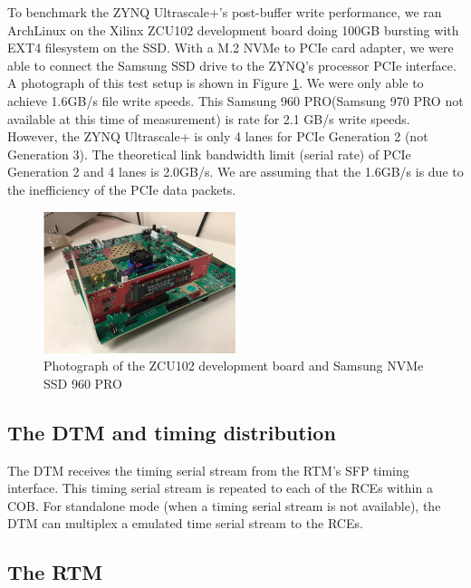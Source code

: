 To benchmark the ZYNQ Ultrascale+'s post-buffer write performance, we ran ArchLinux on the Xilinx ZCU102 development board doing 100GB bursting with EXT4 filesystem on the SSD.  With a M.2 NVMe to PCIe card adapter, we were able to connect the Samsung SSD drive to the ZYNQ's processor PCIe interface.  A photograph of this test setup is shown in Figure \ref{fig:NMVe_performance}. We were only able to achieve 1.6GB/s file write speeds.  This Samsung 960 PRO\cite{SamSSD}(Samsung 970 PRO not available at this time of measurement) is rate for 2.1 GB/s write speeds.  However, the ZYNQ Ultrascale+ is only 4 lanes for PCIe Generation 2 (not Generation 3).  The theoretical link bandwidth limit (serial rate) of PCIe Generation 2 and 4 lanes is 2.0GB/s.  We are assuming that the 1.6GB/s is due to the inefficiency of the PCIe data packets. 

\begin{figure}[tb]
\centering
\includegraphics[width=0.5\textwidth]{images/NMVe_performance.png}
\caption{\label{fig:NMVe_performance} Photograph of the ZCU102 development board and Samsung NVMe SSD 960 PRO}
\end{figure}

\subsection{The DTM and timing distribution}

The DTM receives the timing serial stream from the RTM's SFP timing interface.
This timing serial stream is repeated to each of the RCEs within a COB. 
For standalone mode (when a timing serial stream is not available), the 
DTM can multiplex a emulated time serial stream to the RCEs. 

\subsection{The RTM}

